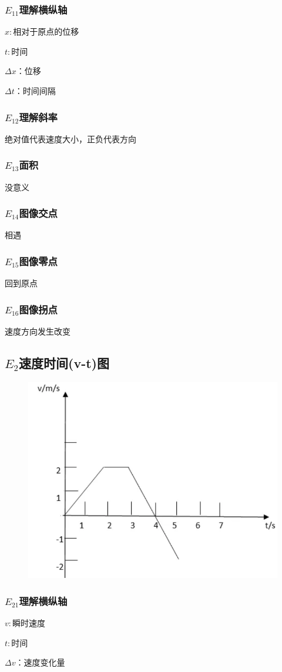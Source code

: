 \documentclass[lang=cn,10pt]{elegantbook}
\begin{document}
	\subsubsection{$E_{11}$理解横纵轴}
	$x:$相对于原点的位移
	
	$t:$时间
	
	$\Delta x$：位移
	
	$\Delta t$：时间间隔
	\subsubsection{$E_{12}$理解斜率}
	
	绝对值代表速度大小，正负代表方向
	\subsubsection{$E_{13}$面积}
	没意义
	\subsubsection{$E_{14}$图像交点}
	相遇
	\subsubsection{$E_{15}$图像零点}
	回到原点
	\subsubsection{$E_{16}$图像拐点}
	速度方向发生改变
	\subsection{$E_2$速度时间(v-t)图}
	\begin{figure}[H]
		\centering
		\includegraphics[width=0.3\linewidth]{image/9}
	\end{figure}
	
	\subsubsection{$E_{21}$理解横纵轴}
	$v:$瞬时速度
	
	$t:$时间
	
	$\Delta v$：速度变化量
	
\end{document}
